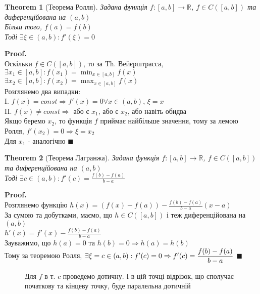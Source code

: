 \documentclass[a4paper, 14pt]{extarticle}
\def\huge{\displaystyle}
\theoremstyle{theoremdd}
\newtheorem{theorem}{Theorem}[subsection]
\theoremstyle{theoremdd}
\theoremstyle{theoremdd}
\theoremstyle{theoremdd}
\theoremstyle{theoremdd}
\theoremstyle{theoremdd}
\theoremstyle{theoremdd}
\theoremstyle{theoremdd}
\newenvironment{pf}{\vspace*{-3mm} \textbf{Proof. \\}}{$\blacksquare$}
\begin{document}
\begin{theorem}[Теорема Ролля]
Задана функція $f: [a,b] \to \mathbb{R}$, $f \in C([a,b])$ та диференційована на $(a,b)$\\
Більш того, $f(a) = f(b)$\\
Тоді $\exists \xi \in (a,b): f'(\xi) = 0$
\end{theorem}
\begin{pf}
Оскільки $f \in C([a,b])$, то за Th. Вейєрштрасса,\\
$\exists x_1 \in [a,b]: f(x_1) = \huge \min_{x \in [a,b]} f(x)$\\
$\exists x_2 \in [a,b]: f(x_2) = \huge \max_{x \in [a,b]} f(x)$\\
Розглянемо два випадки:\\
I. $f(x) = const \Rightarrow f'(x) = 0 \forall x \in (a,b)$, $\xi = x$\\
II. $f(x) \neq const \Rightarrow$ або є $x_1$, або є $x_2$, або навіть обидва\\
Якщо беремо $x_2$, то функція $f$ приймає найбільше значення, тому за лемою Ролля, $f'(x_2) = 0 \Rightarrow \xi = x_2$\\
Для $x_1$ - аналогічно
\end{pf}

\begin{theorem}[Теорема Лагранжа]
Задана функція $f: [a,b] \to \mathbb{R}$, $f \in C([a,b])$ та диференційована на $(a,b)$\\
Тоді $\exists c \in (a,b): f'(c) = \huge \frac{f(b)-f(a)}{b-a}$
\end{theorem}
\begin{pf}
Розглянемо функцію $h(x) = \huge (f(x)-f(a))- \frac{f(b)-f(a)}{b-a}(x-a)$\\
За сумою та добутками, маємо, що $h \in C([a,b])$ і теж диференційована на $(a,b)$\\
$h'(x) = \huge f'(x) - \frac{f(b)-f(a)}{b-a}$\\
Зауважимо, що $h(a) = 0$ та $h(b) = 0 \Rightarrow h(a) = h(b)$\\
Тому за теоремою Ролля, $\exists \xi = c \in (a,b): f'(c) = 0 \\ \Rightarrow f'(c) = \huge \frac{f(b)-f(a)}{b-a}$
\end{pf}
\begin{figure}[H]
\centering
{}
\caption*{Для $f$ в т. $c$ проведемо дотичну. І в цій точці відрізок, що сполучає початкову та кінцеву точку, буде паралельна дотичній}
\end{figure}
\end{document}
